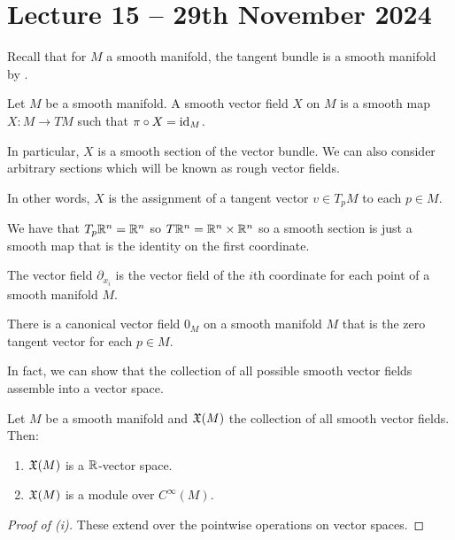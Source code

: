 \section{Lecture 15 -- 29th November 2024}\label{sec: lecture 15}
Recall that for $M$ a smooth manifold, the tangent bundle  is a smooth manifold by . 
\begin{definition}\label{def: vector field}
    Let $M$ be a smooth manifold. A smooth vector field $X$ on $M$ is a smooth map $X:M\to TM$ such that $\pi\circ X=\mathrm{id}_{M}$. 
\end{definition}
\begin{remark}
    In particular, $X$ is a smooth section of the vector bundle. We can also consider arbitrary sections which will be known as rough vector fields. 
\end{remark}
In other words, $X$ is the assignment of a tangent vector $v\in T_{p}M$ to each $p\in M$.
\begin{example}
    We have that $T_{p}\mathbb{R}^{n}=\mathbb{R}^{n}$ so $T\mathbb{R}^{n}=\mathbb{R}^{n}\times\mathbb{R}^{n}$ so a smooth section is just a smooth map that is the identity on the first coordinate. 
\end{example} 
\begin{example}
    The vector field $\partial_{x_{i}}$ is the vector field of the $i$th coordinate for each point of a smooth manifold $M$. 
\end{example}
\begin{example}
    There is a canonical vector field $0_{M}$ on a smooth manifold $M$ that is the zero tangent vector for each $p\in M$. 
\end{example}
In fact, we can show that the collection of all possible smooth vector fields assemble into a vector space. 
\begin{lemma}\label{lem: smooth vector fields form a vector space}
    Let $M$ be a smooth manifold and $\mathfrak{X}(M)$ the collection of all smooth vector fields. Then:
    \begin{enumerate}[label=(\roman*)]
        \item $\mathfrak{X}(M)$ is a $\mathbb{R}$-vector space. 
        \item $\mathfrak{X}(M)$ is a module over $C^{\infty}(M)$. 
    \end{enumerate}
\end{lemma}
\begin{proof}[Proof of (i)]
    These extend over the pointwise operations on vector spaces. 
\end{proof}
